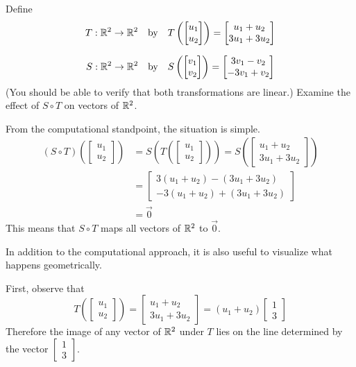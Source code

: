 \documentclass{ximera}
\begin{document}
\begin{example}\label{ex:transcomp} Define $$T:\mathbb{R}^2\rightarrow \mathbb{R}^2 \quad\text{by}\quad T\left(\begin{bmatrix}u_1\\u_2\end{bmatrix}\right)=\begin{bmatrix}u_1+u_2\\3u_1+3u_2\end{bmatrix}$$

$$S:\mathbb{R}^2\rightarrow \mathbb{R}^2 \quad\text{by}\quad S\left(\begin{bmatrix}v_1\\v_2\end{bmatrix}\right)=\begin{bmatrix}3v_1-v_2\\-3v_1+v_2\end{bmatrix}$$
(You should be able to verify that both transformations are linear.)  Examine the effect of $S\circ T$ on vectors of $\mathbb{R}^2$.
\begin{explanation}
From the computational standpoint, the situation is simple.
\begin{align*}
(S\circ T)\left(\begin{bmatrix}u_1\\u_2\end{bmatrix}\right)&=S\left(T\left(\begin{bmatrix}u_1\\u_2\end{bmatrix}\right)\right)=S\left(\begin{bmatrix}u_1+u_2\\3u_1+3u_2\end{bmatrix}\right)\\
&=\begin{bmatrix}3(u_1+u_2)-(3u_1+3u_2)\\-3(u_1+u_2)+(3u_1+3u_2)\end{bmatrix}\\
&=\vec{0}
\end{align*}
This means that $S\circ T$ maps all vectors of $\mathbb{R}^2$ to $\vec{0}$.  

In addition to the computational approach, it is also useful to visualize what happens geometrically.

First, observe that $$T\left(\begin{bmatrix}u_1\\u_2\end{bmatrix}\right)=\begin{bmatrix}u_1+u_2\\3u_1+3u_2\end{bmatrix}=(u_1+u_2)\begin{bmatrix}1\\3\end{bmatrix}$$  Therefore the image of any vector of $\mathbb{R}^2$ under $T$ lies on the line determined by the vector $\begin{bmatrix}1\\3\end{bmatrix}$.  


\end{explanation}
\end{example}
\end{document}
